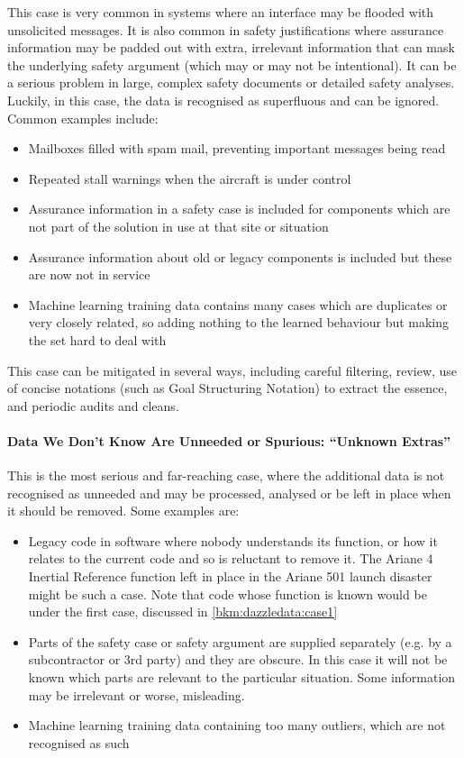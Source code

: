 This case is very common in systems where an interface may be flooded with unsolicited messages.
It is also common in  safety justifications where assurance \gls{information} may be padded out with extra, irrelevant \gls{information} that can mask the underlying safety argument (which may or may not be intentional).
It can be a serious problem in large, complex safety documents or detailed safety analyses.
Luckily, in this case, the data is recognised as superfluous and can be ignored.
Common examples include:
\begin{itemize}
    \item Mailboxes filled with spam mail, preventing important messages being read
    \item Repeated stall warnings when the aircraft is under control
    \item Assurance \gls{information} in a safety case is included for components which are not part of the solution in use at that site or situation
    \item Assurance \gls{information} about old or legacy components is included but these are now not in service
    \item Machine learning training data contains many cases which are duplicates or very closely related, so adding nothing to the learned behaviour but making the set hard to deal with
\end{itemize}
This case can be mitigated in several ways, including careful filtering, review, use of concise  notations (such as Goal Structuring Notation) to extract the essence, and periodic audits and cleans. 

\paragraph{Data We Don’t Know Are Unneeded or Spurious: ``Unknown Extras''}
This is the most serious and far-reaching case, where the additional data is not recognised as unneeded and may be processed, analysed or be left in place when it should be removed. Some examples are:
\begin{itemize}
\item Legacy code in software where nobody understands its function, or how it relates to the current code and so is reluctant to remove it. The Ariane 4 Inertial Reference function left in place in the Ariane 501 launch disaster might be such a case. Note that code whose function is known would be under the first case, discussed in \ref{bkm:dazzledata:case1}
    \item Parts of the safety case or safety argument are supplied separately (e.g. by a subcontractor or 3rd party) and they are obscure. In this case it will not be known which parts are relevant to the particular situation. Some \gls{information} may be irrelevant or worse, misleading.
    \item Machine learning training data containing too many outliers, which are not recognised as such
\end{itemize}

